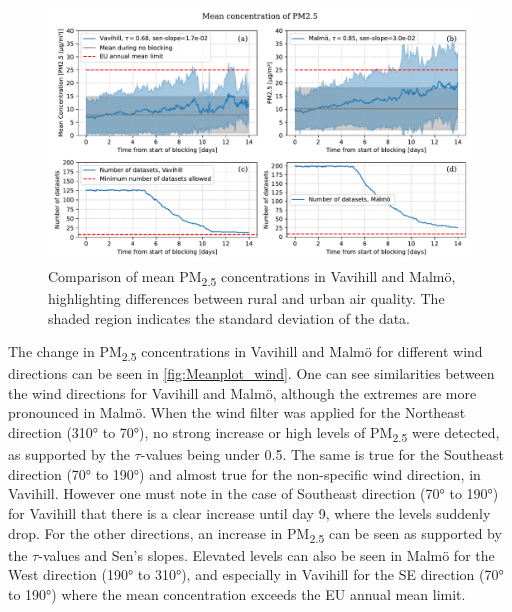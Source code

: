 \begin{figure}[H]
    \centering
    \includegraphics[width=\textwidth]{Figures/Meanplot.pdf}
    \caption{Comparison of mean PM\textsubscript{2.5} concentrations in Vavihill and Malmö, highlighting differences between rural and urban air quality. The shaded region indicates the standard deviation of the data.}
    \label{fig:Meanplot_Comparison}
\end{figure}

The change in PM\textsubscript{2.5} concentrations in Vavihill and Malmö for different wind directions can be seen in \autoref{fig:Meanplot_wind}. One can see similarities between the wind directions for Vavihill and Malmö, although the extremes are more pronounced in Malmö. When the wind filter was applied for the Northeast direction (310° to 70°), no strong increase or high levels of PM\textsubscript{2.5} were detected, as supported by the $\tau$-values being under 0.5. The same is true for the Southeast direction (70° to 190°) and almost true for the non-specific wind direction, in Vavihill. However one must note in the case of Southeast direction (70° to 190°) for Vavihill that there is a clear increase until day 9, where the levels suddenly drop. For the other directions, an increase in PM\textsubscript{2.5} can be seen as supported by the $\tau$-values and Sen's slopes. Elevated levels can also be seen in Malmö for the West direction (190° to 310°), and especially in Vavihill for the SE direction (70° to 190°) where the mean concentration exceeds the EU annual mean limit.


